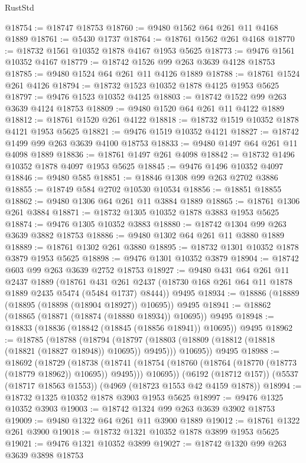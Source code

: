 \begin{lexlean}{RustStd}
\begin{coremodule}
@18754 := @18747 @18753
@18760 := @9480 @1562 @64 @261 @11 @4168 @1889
@18761 := @5430 @1737
@18764 := @18761 @1562 @261 @4168
@18770 := @18732 @1561 @10352 @1878 @4167 @1953 @5625
@18773 := @9476 @1561 @10352 @4167
@18779 := @18742 @1526 @99 @263 @3639 @4128 @18753
@18785 := @9480 @1524 @64 @261 @11 @4126 @1889
@18788 := @18761 @1524 @261 @4126
@18794 := @18732 @1523 @10352 @1878 @4125 @1953 @5625
@18797 := @9476 @1523 @10352 @4125
@18803 := @18742 @1522 @99 @263 @3639 @4124 @18753
@18809 := @9480 @1520 @64 @261 @11 @4122 @1889
@18812 := @18761 @1520 @261 @4122
@18818 := @18732 @1519 @10352 @1878 @4121 @1953 @5625
@18821 := @9476 @1519 @10352 @4121
@18827 := @18742 @1499 @99 @263 @3639 @4100 @18753
@18833 := @9480 @1497 @64 @261 @11 @4098 @1889
@18836 := @18761 @1497 @261 @4098
@18842 := @18732 @1496 @10352 @1878 @4097 @1953 @5625
@18845 := @9476 @1496 @10352 @4097
@18846 := @9480 @585
@18851 := @18846 @1308 @99 @263 @2702 @3886
@18855 := @18749 @584 @2702 @10530 @10534
@18856 := @18851 @18855
@18862 := @9480 @1306 @64 @261 @11 @3884 @1889
@18865 := @18761 @1306 @261 @3884
@18871 := @18732 @1305 @10352 @1878 @3883 @1953 @5625
@18874 := @9476 @1305 @10352 @3883
@18880 := @18742 @1304 @99 @263 @3639 @3882 @18753
@18886 := @9480 @1302 @64 @261 @11 @3880 @1889
@18889 := @18761 @1302 @261 @3880
@18895 := @18732 @1301 @10352 @1878 @3879 @1953 @5625
@18898 := @9476 @1301 @10352 @3879
@18904 := @18742 @603 @99 @263 @3639 @2752 @18753
@18927 := @9480
    @431
    @64
    @261
    @11
    @2437
    @1889
    (@18761 @431 @261 @2437 (@18730 @168 @261 @64 @11 @1878 @1889 @2435 @5474 (@5484 @1737) @8444))
    @9495
@18934 := @18886 (@18889 (@18895 (@18898 (@18904 @18927)) @10695)) @9495
@18941 := @18862 (@18865 (@18871 (@18874 (@18880 @18934)) @10695)) @9495
@18948 := @18833 (@18836 (@18842 (@18845 (@18856 @18941)) @10695)) @9495
@18962 := @18785
    (@18788
      (@18794
        (@18797 (@18803 (@18809 (@18812 (@18818 (@18821 (@18827 @18948)) @10695)) @9495)))
        @10695))
    @9495
@18988 := @18692
    (@18729
      (@18738
        (@18741 (@18754 (@18760 (@18764 (@18770 (@18773 (@18779 @18962)) @10695)) @9495)))
        @10695))
    (@6192 (@18712 @157))
    (@5537 (@18717 @18563 @1553))
    (@4969 (@18723 @1553 @42 @4159 @1878))
@18994 := @18732 @1325 @10352 @1878 @3903 @1953 @5625
@18997 := @9476 @1325 @10352 @3903
@19003 := @18742 @1324 @99 @263 @3639 @3902 @18753
@19009 := @9480 @1322 @64 @261 @11 @3900 @1889
@19012 := @18761 @1322 @261 @3900
@19018 := @18732 @1321 @10352 @1878 @3899 @1953 @5625
@19021 := @9476 @1321 @10352 @3899
@19027 := @18742 @1320 @99 @263 @3639 @3898 @18753

\end{coremodule}
\end{lexlean}
